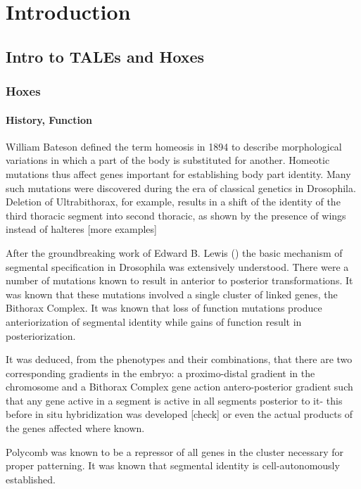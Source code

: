 \chapter{Introduction}


\section{Intro to TALEs and Hoxes}

\subsection{Hoxes}

\subsubsection{History, Function}
William Bateson defined the term homeosis in 1894 to describe morphological variations in which a part of the body is substituted for another. Homeotic mutations thus affect genes important for establishing body part identity. Many such mutations were discovered during the era of classical genetics in Drosophila. Deletion of Ultrabithorax, for example, results in a shift of the identity of the third thoracic segment into second thoracic, as shown by the presence of wings instead of halteres \cite{ref} [more examples]

After the groundbreaking work of Edward B. Lewis (\cite{Lewis1978}) the basic mechanism of segmental specification in Drosophila was extensively understood. There were a number of mutations known to result in anterior to posterior transformations. It was known that these mutations involved a single cluster of linked genes, the Bithorax Complex. It was known that loss of function mutations produce anteriorization of segmental identity while gains of function result in posteriorization. 

It was deduced, from the phenotypes and their combinations, that there are two corresponding gradients in the embryo: a proximo-distal gradient in the chromosome and a Bithorax Complex gene action antero-posterior gradient such that any gene active in a segment is active in all segments posterior to it- this before in situ hybridization was developed [check] or even the actual products of the genes affected where known.

Polycomb was known to be a repressor of all genes in the cluster necessary for proper patterning. It was known that segmental identity is cell-autonomously established. 

